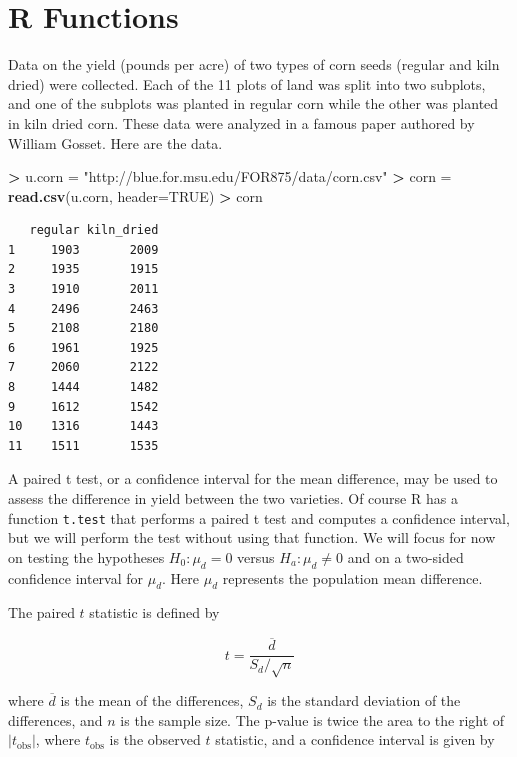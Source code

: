 \documentclass[]{krantz}
\makeatletter
\newenvironment{Shaded}{\begin{snugshade}}{\end{snugshade}}
\newcommand{\KeywordTok}[1]{\textcolor[rgb]{0.27,0.27,0.27}{\textbf{#1}}}
\newcommand{\DataTypeTok}[1]{\textcolor[rgb]{0.27,0.27,0.27}{#1}}
\newcommand{\StringTok}[1]{\textcolor[rgb]{0.5,0.5,0.5}{#1}}
\newcommand{\OtherTok}[1]{\textcolor[rgb]{0.37,0.37,0.37}{#1}}
\newcommand{\OperatorTok}[1]{\textcolor[rgb]{0.43,0.43,0.43}{\textbf{#1}}}
\newcommand{\NormalTok}[1]{#1}
\newenvironment{kframe}{%
\medskip{}
\setlength{\fboxsep}{.8em}
 \def\at@end@of@kframe{}%
 \ifinner\ifhmode%
  \def\at@end@of@kframe{\end{minipage}}%
  \begin{minipage}{\columnwidth}%
 \fi\fi%
 \def\FrameCommand##1{\hskip\@totalleftmargin \hskip-\fboxsep
 \colorbox{shadecolor}{##1}\hskip-\fboxsep
     \hskip-\linewidth \hskip-\@totalleftmargin \hskip\columnwidth}%
 \MakeFramed {\advance\hsize-\width
   \@totalleftmargin\z@ \linewidth\hsize
   \@setminipage}}%
 {\par\unskip\endMakeFramed%
 \at@end@of@kframe}
\renewenvironment{Shaded}{\begin{kframe}}{\end{kframe}}
\makeatother
\begin{document}
\section{R Functions}\label{r-functions}

Data on the yield (pounds per acre) of two types of corn seeds (regular
and kiln dried) were collected. Each of the 11 plots of land was split
into two subplots, and one of the subplots was planted in regular corn
while the other was planted in kiln dried corn. These data were analyzed
in a famous paper authored by William Gosset. Here are the data.

\begin{Shaded}
\begin{Highlighting}[]
\OperatorTok{>}\StringTok{ }\NormalTok{u.corn =}\StringTok{ "http://blue.for.msu.edu/FOR875/data/corn.csv"}
\OperatorTok{>}\StringTok{ }\NormalTok{corn =}\StringTok{ }\KeywordTok{read.csv}\NormalTok{(u.corn, }\DataTypeTok{header=}\OtherTok{TRUE}\NormalTok{)}
\OperatorTok{>}\StringTok{ }\NormalTok{corn}
\end{Highlighting}
\end{Shaded}

\begin{verbatim}
   regular kiln_dried
1     1903       2009
2     1935       1915
3     1910       2011
4     2496       2463
5     2108       2180
6     1961       1925
7     2060       2122
8     1444       1482
9     1612       1542
10    1316       1443
11    1511       1535
\end{verbatim}

A paired t test, or a confidence interval for the mean difference, may
be used to assess the difference in yield between the two varieties. Of
course R has a function \texttt{t.test} that performs a paired t test
and computes a confidence interval, but we will perform the test without
using that function. We will focus for now on testing the hypotheses
\(H_0\colon \mu_d = 0\) versus \(H_a\colon \mu_d \neq 0\) and on a
two-sided confidence interval for \(\mu_d\). Here \(\mu_d\) represents
the population mean difference.

The paired \(t\) statistic is defined by

\begin{equation}
t = \frac{\overline d}{S_d/\sqrt{n}}
\end{equation}

where \(\overline d\) is the mean of the differences, \(S_d\) is the
standard deviation of the differences, and \(n\) is the sample size. The
p-value is twice the area to the right of \(|t_{\text{obs}}|\), where
\(t_{\text{obs}}\) is the observed \(t\) statistic, and a confidence
interval is given by
\end{document}
